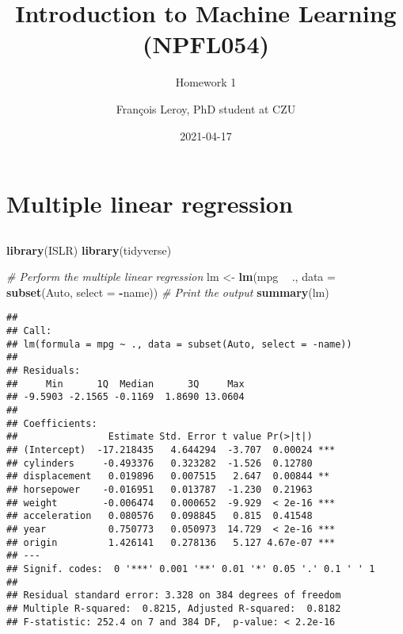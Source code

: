 \documentclass[
  12pt,
  oneside]{report}
\title{Introduction to Machine Learning\\
(NPFL054)}
\subtitle{Homework 1}
\author{François Leroy, PhD student at CZU}
\date{2021-04-17}
\newenvironment{Shaded}{\begin{snugshade}}{\end{snugshade}}
\newcommand{\CommentTok}[1]{\textcolor[rgb]{0.56,0.35,0.01}{\textit{#1}}}
\newcommand{\DataTypeTok}[1]{\textcolor[rgb]{0.13,0.29,0.53}{#1}}
\newcommand{\KeywordTok}[1]{\textcolor[rgb]{0.13,0.29,0.53}{\textbf{#1}}}
\newcommand{\NormalTok}[1]{#1}
\newcommand{\OperatorTok}[1]{\textcolor[rgb]{0.81,0.36,0.00}{\textbf{#1}}}
\newcommand{\StringTok}[1]{\textcolor[rgb]{0.31,0.60,0.02}{#1}}
\begin{document}
\maketitle


\cleardoublepage 
{}

{
\hypersetup{linkcolor=}
\setcounter{tocdepth}{1}
\tableofcontents
\newpage
}
\vspace{50mm}


\cleardoublepage 
{}


\hypertarget{q1}{%
\chapter{Multiple linear regression}\label{q1}}

\hypertarget{section}{%
\section{}\label{section}}

\begin{Shaded}
\begin{Highlighting}[]
\KeywordTok{library}\NormalTok{(ISLR)}
\KeywordTok{library}\NormalTok{(tidyverse)}
\end{Highlighting}
\end{Shaded}

\begin{Shaded}
\begin{Highlighting}[]
\CommentTok{# Perform the multiple linear regression}
\NormalTok{lm <-}\StringTok{ }
\StringTok{  }\KeywordTok{lm}\NormalTok{(mpg }\OperatorTok{~}\StringTok{ }\NormalTok{., }\DataTypeTok{data =} \KeywordTok{subset}\NormalTok{(Auto, }\DataTypeTok{select =} \OperatorTok{-}\NormalTok{name))}
\CommentTok{# Print the output}
\KeywordTok{summary}\NormalTok{(lm)}
\end{Highlighting}
\end{Shaded}

\begin{verbatim}
## 
## Call:
## lm(formula = mpg ~ ., data = subset(Auto, select = -name))
## 
## Residuals:
##     Min      1Q  Median      3Q     Max 
## -9.5903 -2.1565 -0.1169  1.8690 13.0604 
## 
## Coefficients:
##                Estimate Std. Error t value Pr(>|t|)    
## (Intercept)  -17.218435   4.644294  -3.707  0.00024 ***
## cylinders     -0.493376   0.323282  -1.526  0.12780    
## displacement   0.019896   0.007515   2.647  0.00844 ** 
## horsepower    -0.016951   0.013787  -1.230  0.21963    
## weight        -0.006474   0.000652  -9.929  < 2e-16 ***
## acceleration   0.080576   0.098845   0.815  0.41548    
## year           0.750773   0.050973  14.729  < 2e-16 ***
## origin         1.426141   0.278136   5.127 4.67e-07 ***
## ---
## Signif. codes:  0 '***' 0.001 '**' 0.01 '*' 0.05 '.' 0.1 ' ' 1
## 
## Residual standard error: 3.328 on 384 degrees of freedom
## Multiple R-squared:  0.8215, Adjusted R-squared:  0.8182 
## F-statistic: 252.4 on 7 and 384 DF,  p-value: < 2.2e-16
\end{verbatim}
\end{document}
